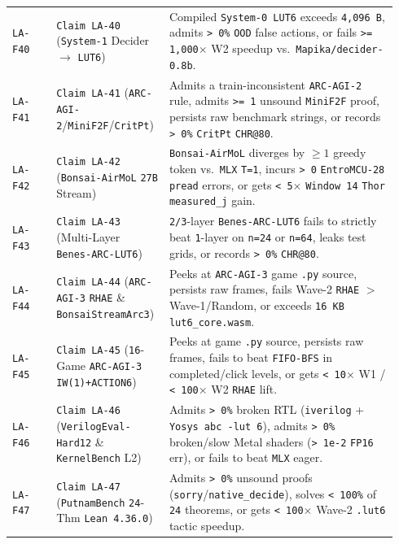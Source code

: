 \documentclass[10pt]{article}
\begin{document}
{\begin{longtable}{@{}L{0.11\linewidth}L{0.25\linewidth}L{0.58\linewidth}@{}}
\texttt{LA-F40} & \texttt{Claim LA-40} (\texttt{System-1} Decider $\to$ \texttt{LUT6}) & Compiled \texttt{System-0 LUT6} exceeds \texttt{4,096 B}, admits \texttt{> 0\%} \texttt{OOD} false actions, or fails \texttt{>= 1,000$\times$} W2 speedup vs.\ \texttt{Mapika/decider-0.8b}. \\
\texttt{LA-F41} & \texttt{Claim LA-41} (\texttt{ARC-AGI-2}/\texttt{MiniF2F}/\texttt{CritPt}) & Admits a train-inconsistent \texttt{ARC-AGI-2} rule, admits \texttt{>= 1} unsound \texttt{MiniF2F} proof, persists raw benchmark strings, or records \texttt{> 0\%} \texttt{CritPt} \texttt{CHR@80}. \\
\texttt{LA-F42} & \texttt{Claim LA-42} (\texttt{Bonsai-AirMoL} \texttt{27B} Stream) & \texttt{Bonsai-AirMoL} diverges by $\ge 1$ greedy token vs.\ \texttt{MLX} \texttt{T=1}, incurs \texttt{> 0} \texttt{EntroMCU-28} \texttt{pread} errors, or gets \texttt{< 5$\times$} \texttt{Window 14} \texttt{Thor} \texttt{measured\_j} gain. \\
\texttt{LA-F43} & \texttt{Claim LA-43} (Multi-Layer \texttt{Benes-ARC-LUT6}) & \texttt{2/3}-layer \texttt{Benes-ARC-LUT6} fails to strictly beat \texttt{1}-layer on \texttt{n=24} or \texttt{n=64}, leaks test grids, or records \texttt{> 0\%} \texttt{CHR@80}. \\
\texttt{LA-F44} & \texttt{Claim LA-44} (\texttt{ARC-AGI-3} \texttt{RHAE} \& \texttt{BonsaiStreamArc3}) & Peeks at \texttt{ARC-AGI-3} game \texttt{.py} source, persists raw frames, fails Wave-2 \texttt{RHAE} $>$ Wave-1/Random, or exceeds \texttt{16 KB} \texttt{lut6\_core.wasm}. \\
\texttt{LA-F45} & \texttt{Claim LA-45} (\texttt{16}-Game \texttt{ARC-AGI-3} \texttt{IW(1)+ACTION6}) & Peeks at game \texttt{.py} source, persists raw frames, fails to beat \texttt{FIFO-BFS} in completed/click levels, or gets \texttt{< 10$\times$} W1 / \texttt{< 100$\times$} W2 \texttt{RHAE} lift. \\
\texttt{LA-F46} & \texttt{Claim LA-46} (\texttt{VerilogEval-Hard12} \& \texttt{KernelBench} L2) & Admits \texttt{> 0\%} broken RTL (\texttt{iverilog} + \texttt{Yosys abc -lut 6}), admits \texttt{> 0\%} broken/slow Metal shaders (\texttt{> 1e-2} \texttt{FP16} err), or fails to beat \texttt{MLX} eager. \\
\texttt{LA-F47} & \texttt{Claim LA-47} (\texttt{PutnamBench} \texttt{24}-Thm \texttt{Lean 4.36.0}) & Admits \texttt{> 0\%} unsound proofs (\texttt{sorry}/\texttt{native\_decide}), solves \texttt{< 100\%} of \texttt{24} theorems, or gets \texttt{< 100$\times$} Wave-2 \texttt{.lut6} tactic speedup. \\

\end{longtable}}
\end{document}
